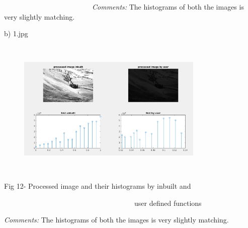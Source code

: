 \documentclass[12pt]{article}
\begin{document}
\ \ \ \ \ \ \ \ \ \ \ \ \ \ \ \ \ \ \ \ \ \ \ \ \  \textit{Comments: }The histograms of both the images is very slightly matching.\par

\tab \tab 
\vspace{\baselineskip}\begin{justify}
\tab b) 1.jpg
\end{justify}\par




\begin{figure}[H]
	\begin{Center}
		\includegraphics[width=3.5in,height=2.61in]{./media/image24.png}
	\end{Center}
\end{figure}



\tab \par

\begin{adjustwidth}{1.0in}{0.0in}
\begin{Center}
Fig 12- Processed image and their histograms by inbuilt and 
\end{Center}\par

\end{adjustwidth}

\begin{Center}
\ \ \ \ \ \ \ \ \ \ \ \ \ \ \ \ \ \ \ \ \ \ \ \ \ \ \ \ \ \ \ \ \ \ \ \ \  user defined functions
\end{Center}\par

\begin{FlushLeft}
\tab \tab \textit{Comments: }The histograms of both the images is very slightly matching.
\end{FlushLeft}\par


\printbibliography
\end{document}
